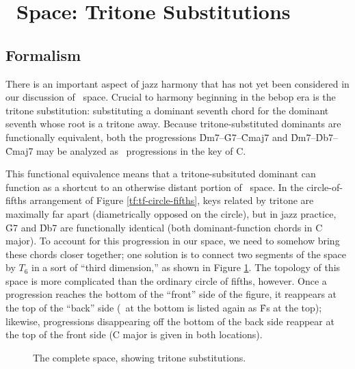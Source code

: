 


\section{\tf\ Space: Tritone Substitutions}

\subsection{Formalism}

There is an important aspect of jazz harmony that has not yet been considered in
our discussion of \tf\ space. Crucial to harmony beginning in the bebop era is
the tritone substitution: substituting a dominant seventh chord for the
dominant seventh whose root is a tritone away. Because
tritone-substituted dominants are functionally equivalent, both the
progressions \h{Dm7}--\h{G7}--\h{Cmaj7} and \h{Dm7}--\h{Db7}--\h{Cmaj7} may be
analyzed as \tfo\ progressions in the key of C.

This functional equivalence means that a tritone-subsituted dominant can
function as a shortcut to an otherwise distant portion of \tf\ space. In the
circle-of-fifths arrangement of Figure \ref{tf:tf-circle-fifths}, keys related
by tritone are maximally far apart (diametrically opposed on the circle), but
in jazz practice, \h{G7} and \h{Db7} are functionally identical (both
dominant-function chords in C major). To account for this progression in our
space, we need to somehow bring these chords closer together; one solution is
to connect two segments of the space by $T_6$ in a sort of ``third
dimension,'' as shown in Figure \ref{tft:complete-space}. The topology of this
space is more complicated than the ordinary circle of fifths, however. Once a
progression reaches the bottom of the ``front'' side of the figure, it
reappears at the top of the ``back'' side (\Gflat\ at the bottom is listed
again as \h{Fs} at the top); likewise, progressions disappearing off the
bottom of the back side reappear at the top of the front side (C major is
given in both locations).

\begin{figure}[thb]
  \caption{The complete \tf space, showing tritone substitutions.}
  \label{tft:complete-space}
\end{figure}



